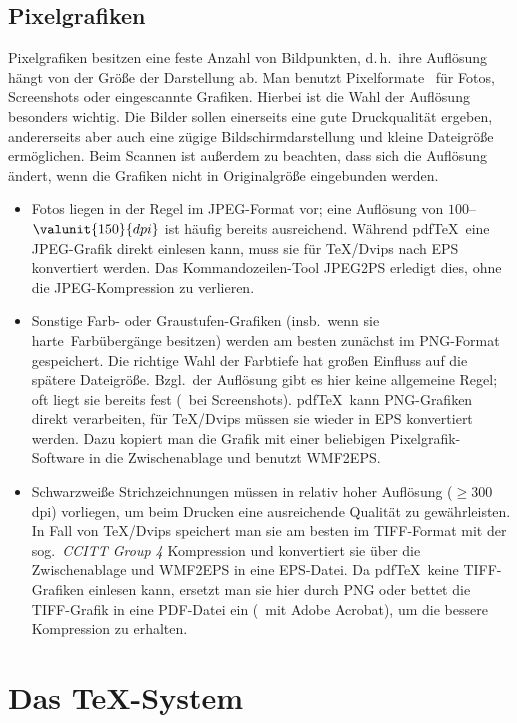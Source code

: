 \section{Pixelgrafiken}

Pixelgrafiken besitzen eine feste Anzahl von Bildpunkten, d.\,h.\ ihre
Auflösung hängt von der Größe der Darstellung ab. Man benutzt Pixelformate
\zB\ für Fotos, Screenshots oder eingescannte Grafiken. Hierbei ist die Wahl der
Auflösung besonders wichtig. Die Bilder sollen einerseits eine gute
Druckqualität ergeben, andererseits aber auch eine zügige Bildschirmdarstellung
und kleine Dateigröße ermöglichen. Beim Scannen ist außerdem zu beachten, dass
sich die Auflösung ändert, wenn die Grafiken nicht in Originalgröße eingebunden
werden.
\begin{itemize}
\item Fotos liegen in der Regel im JPEG-Format vor; eine Auflösung von
  $100$--$\valunit{150}{dpi}$ ist häufig bereits ausreichend. Während pdf\TeX\ eine
  JPEG-Grafik direkt einlesen kann, muss sie für \TeX/Dvips nach EPS konvertiert
  werden. Das Kommandozeilen-Tool JPEG2PS erledigt dies, ohne die
  JPEG-Kompression zu verlieren.
\item Sonstige Farb- oder Graustufen-Grafiken (insb.\ wenn sie \glqq harte\grqq\
  Farbübergänge besitzen) werden am besten zunächst im PNG-Format gespeichert.
  Die richtige Wahl der Farbtiefe hat großen Einfluss auf die spätere
  Dateigröße. Bzgl.\ der Auflösung gibt es hier keine allgemeine Regel; oft
  liegt sie bereits fest (\zB\ bei Screenshots). pdf\TeX\ kann PNG-Grafiken
  direkt verarbeiten, für \TeX/Dvips müssen sie wieder in EPS konvertiert
  werden. Dazu kopiert man die Grafik mit einer beliebigen Pixelgrafik-Software
  in die Zwischenablage und benutzt WMF2EPS.
\item Schwarzweiße Strichzeichnungen müssen in relativ hoher Auflösung
  ($\ge$300\,dpi) vorliegen, um beim Drucken eine ausreichende Qualität zu
  gewährleisten. In Fall von \TeX/Dvips speichert man sie am besten im
  TIFF-Format mit der sog.\ \emph{CCITT Group 4} Kompression und konvertiert sie
  über die Zwischenablage und WMF2EPS in eine EPS-Datei. Da pdf\TeX\ keine
  TIFF-Grafiken einlesen kann, ersetzt man sie hier durch PNG oder bettet die
  TIFF-Grafik in eine PDF-Datei ein (\zB\ mit Adobe Acrobat), um die bessere
  Kompression zu erhalten.
\end{itemize}



\chapter{Das \TeX-System}\label{cha:TexSystem}


